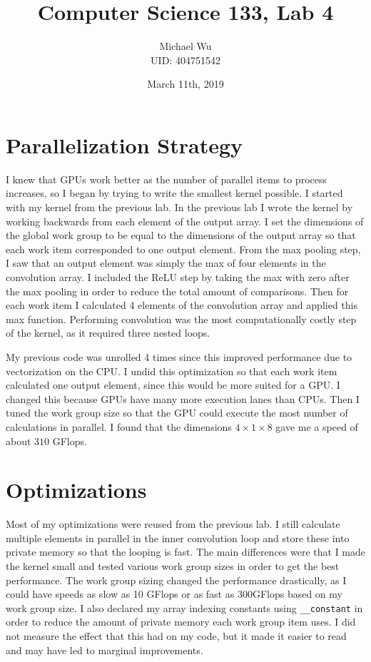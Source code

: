 \documentclass[12pt]{article}
\begin{document}
\title{Computer Science 133, Lab 4}
\date{March 11th, 2019}
\author{Michael Wu\\UID: 404751542}
\maketitle

\section{Parallelization Strategy}

I knew that GPUs work better as the number of parallel items to process increases,
so I began by trying to write the smallest kernel possible. I started with my kernel
from the previous lab. In the previous lab I wrote the kernel by working backwards from each element of the
output array. I set the dimensions of the global work group to be equal to the dimensions of the output
array so that each work item corresponded to one output element. From the max pooling step, I saw that an output
element was simply the max of four elements in the convolution array. I included the ReLU step by taking the max
with zero after the max pooling in order to reduce the total amount of comparisons. Then for each work item
I calculated 4 elements of the convolution array and applied this max function. Performing convolution was
the most computationally costly step of the kernel, as it required three nested loops.

My previous code was unrolled 4 times since this improved performance due to vectorization on the CPU. I undid
this optimization so that each work item calculated one output element, since this would be more suited for a GPU.
I changed this because GPUs have many more execution lanes than CPUs. Then I tuned the work group size so
that the GPU could execute the most number of calculations in parallel. I found that the dimensions
\(4\times 1\times 8\) gave me a speed of about \(310\) GFlops.

\section{Optimizations}

Most of my optimizations were reused from the previous lab. I still calculate multiple elements in parallel in the inner
convolution loop and store these into private memory so that the looping is fast. The main differences were
that I made the kernel small and tested various work group sizes in order to get the best performance. The work group sizing changed the
performance drastically, as I could have speeds as slow as 10 GFlops or as fast as 300GFlops based on my work group size.
I also declared my array indexing constants using \texttt{\_\_constant} in order to reduce the amount of private memory each
work group item uses. I did not measure the effect that this had on my code, but it made it easier to read and may have led
to marginal improvements.
\end{document}
